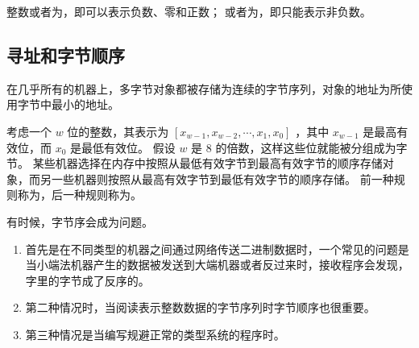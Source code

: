 {{        整数或者为，即可以表示负数、零和正数；
        或者为，即只能表示非负数。
    }

    \subsection{寻址和字节顺序}
    {
        在几乎所有的机器上，多字节对象都被存储为连续的字节序列，对象的地址为所使用字节中最小的地址。

        考虑一个 $w$ 位的整数，其表示为 $[x_{w - 1}, x_{w - 2}, \cdots, x_1, x_0]$ ，其中 $x_{w - 1}$ 是最高有效位，而 $x_0$ 是最低有效位。
        假设 $w$ 是 $8$ 的倍数，这样这些位就能被分组成为字节。
        某些机器选择在内存中按照从最低有效字节到最高有效字节的顺序存储对象，而另一些机器则按照从最高有效字节到最低有效字节的顺序存储。
        前一种规则称为，后一种规则称为。

        有时候，字节序会成为问题。

        \begin{enumerate}
            \item
            {
                首先是在不同类型的机器之间通过网络传送二进制数据时，一个常见的问题是当小端法机器产生的数据被发送到大端机器或者反过来时，接收程序会发现，字里的字节成了反序的。
            }
            \item
            {
                第二种情况时，当阅读表示整数数据的字节序列时字节顺序也很重要。
            }
            \item
            {
                第三种情况是当编写规避正常的类型系统的程序时。
            }
        \end{enumerate}
    }
}

